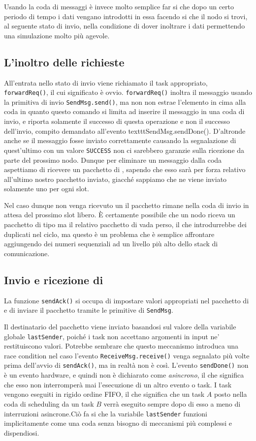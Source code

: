 \documentclass[twoside,11pt,a4paper,italian,openany]{book}
\begin{document}
Usando la coda di messaggi è invece molto semplice far si che dopo un certo periodo di tempo 
i dati vengano introdotti in essa facendo si che il nodo si trovi, al seguente stato di invio, 
nella condizione di dover inoltrare i dati permettendo una simulazione molto più agevole. 


\subsection{L'inoltro delle richieste}
All'entrata nello stato di invio viene richiamato il task appropriato, 
\texttt{forwardReq()}, il cui significato è ovvio.
\texttt{forwardReq()} inoltra il messaggio usando la primitiva di invio \texttt{SendMsg.send()},
ma non non estrae l'elemento in cima alla coda in quanto questo comando si limita ad inserire 
il messaggio in una coda di invio, e riporta solamente il successo di questa operazione 
e non il successo dell'invio, compito demandato all'evento texttt{SendMsg.sendDone()}.
D'altronde anche se il messaggio fosse inviato correttamente causando la segnalazione di 
quest'ultimo con un valore \texttt{SUCCESS}  non ci sarebbero garanzie sulla ricezione da 
parte del prossimo nodo. Dunque per eliminare un messaggio dalla coda aspettiamo di ricevere 
un pacchetto di \ack, sapendo che esso sarà per forza relativo all'ultimo nostro pacchetto 
inviato, giacché sappiamo che ne viene inviato solamente uno per ogni slot. 

Nel caso dunque non venga ricevuto un \ack il pacchetto rimane nella coda di invio in attesa 
del prossimo slot libero. \`E certamente possibile che un nodo riceva un pacchetto di tipo \req 
ma il relativo pacchetto di \ack vada perso, il che introdurrebbe dei duplicati nel ciclo, 
ma questo è un problema che è semplice affrontare aggiungendo dei numeri sequenziali ad un 
livello più alto dello stack di comunicazione. 



\subsection{Invio e ricezione di \ack}
La funzione \texttt{sendAck()} si occupa di impostare valori appropriati nel pacchetto di \ack 
e di inviare il pacchetto tramite le primitive di \texttt{SendMsg}. 

Il destinatario del pacchetto \ack viene inviato basandosi sul valore della variabile 
globale \texttt{lastSender}, poiché i task non accettano argomenti in input ne' 
restituiscono valori. 
Potrebbe sembrare che questo meccanismo introduca una race condition nel caso l'evento 
\texttt{ReceiveMsg.receive()} venga segnalato più volte prima dell'avvio di \texttt{sendAck()},
ma in realtà non è così. L'evento \texttt{sendDone()} non è un evento hardware, e quindi non 
è dichiarato come \emph{asincrono}, il che significa che esso non interromperà mai l'esecuzione 
di un altro evento o task. 
I task vengono eseguiti in rigido ordine FIFO, il che significa che un task $A$ posto nella coda 
di scheduling da un task $B$ verrà eseguito sempre dopo di esso a meno di interruzioni asincrone.Ciò fa si che la variabile \texttt{lastSender} funzioni implicitamente come una coda senza 
bisogno di meccanismi più complessi e dispendiosi. 
\end{document}
